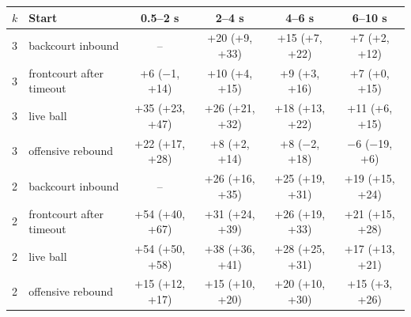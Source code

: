 \begin{tabular}{llcccc}
\toprule
$k$ & Start & 0.5--2 s & 2--4 s & 4--6 s & 6--10 s \\
\midrule
3 & backcourt inbound & -- & +20 (+9, +33) & +15 (+7, +22) & +7 (+2, +12) \\
3 & frontcourt after timeout & +6 ($-$1, +14) & +10 (+4, +15) & +9 (+3, +16) & +7 (+0, +15) \\
3 & live ball & +35 (+23, +47) & +26 (+21, +32) & +18 (+13, +22) & +11 (+6, +15) \\
3 & offensive rebound & +22 (+17, +28) & +8 (+2, +14) & +8 ($-$2, +18) & $-$6 ($-$19, +6) \\
2 & backcourt inbound & -- & +26 (+16, +35) & +25 (+19, +31) & +19 (+15, +24) \\
2 & frontcourt after timeout & +54 (+40, +67) & +31 (+24, +39) & +26 (+19, +33) & +21 (+15, +28) \\
2 & live ball & +54 (+50, +58) & +38 (+36, +41) & +28 (+25, +31) & +17 (+13, +21) \\
2 & offensive rebound & +15 (+12, +17) & +15 (+10, +20) & +20 (+10, +30) & +15 (+3, +26) \\
\bottomrule
\end{tabular}
